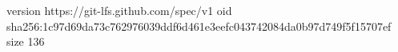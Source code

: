 version https://git-lfs.github.com/spec/v1
oid sha256:1c97d69da73c762976039ddf6d461e3eefc043742084da0b97d749f5f15707ef
size 136
